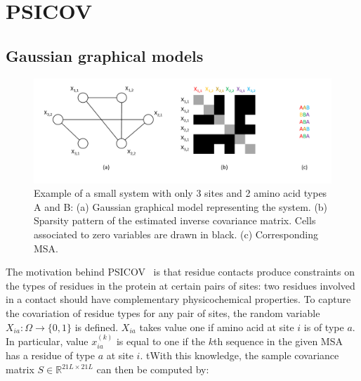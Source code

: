 \section{PSICOV}

    \subsection{Gaussian graphical models}

        \begin{figure}[H]
            \begin{center}
                \includegraphics[width=\textwidth, keepaspectratio]{imgs/ggm.png}
                \caption{Example of a small system with only 3 sites and 2 amino acid types A and B:
                    (a) Gaussian graphical model representing the system.
                    (b) Sparsity pattern of the estimated inverse covariance matrix.
                    Cells associated to zero variables are drawn in black. (c) Corresponding MSA.}
                \label{thresholds}
            \end{center}
        \end{figure}


        The motivation behind PSICOV~\cite{doi:10.1093/bioinformatics/btr638} is that residue contacts produce constraints on the types of residues in the
        protein at certain pairs of sites: two residues involved in a contact should have complementary physicochemical properties. To capture the covariation
        of residue types for any pair of sites, the random variable $X_{ia}: \Omega \rightarrow \{0, 1\}$ is defined. $X_{ia}$ takes value one if
        amino acid at site $i$ is of type $a$. In particular, value $x_{ia}^{(k)}$ is equal to one if the $k$th sequence in the given MSA has a residue of type $a$
        at site $i$. tWith this knowledge, the sample covariance matrix $S \in \mathbb{R}^{21 L \times 21 L}$ can then be computed by:

